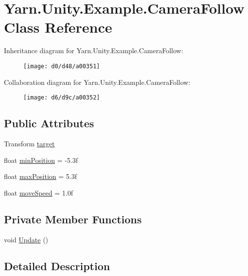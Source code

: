 \hypertarget{a00023}{\section{Yarn.\-Unity.\-Example.\-Camera\-Follow Class Reference}
\label{a00023}
}


Inheritance diagram for Yarn.\-Unity.\-Example.\-Camera\-Follow\-:
\nopagebreak
\begin{figure}[H]
\begin{center}
\leavevmode
\texttt{[image: d0/d48/a00351]}
\end{center}
\end{figure}


Collaboration diagram for Yarn.\-Unity.\-Example.\-Camera\-Follow\-:
\nopagebreak
\begin{figure}[H]
\begin{center}
\leavevmode
\texttt{[image: d6/d9c/a00352]}
\end{center}
\end{figure}
\subsection*{Public Attributes}
\begin{DoxyCompactItemize}
\item 
Transform \hyperlink{a00023_aa5d6958fb14a14ebb74e21c372fcca8b}{target}
\item 
float \hyperlink{a00023_a08c6f6c0ea423c21af99e4b5467d3c9b}{min\-Position} = -\/5.\-3f
\item 
float \hyperlink{a00023_abb0154dcbc2a7d43795beacd61a56de4}{max\-Position} = 5.\-3f
\item 
float \hyperlink{a00023_a3d4f2efe9c2cee8c7ff797cac03f27ec}{move\-Speed} = 1.\-0f
\end{DoxyCompactItemize}
\subsection*{Private Member Functions}
\begin{DoxyCompactItemize}
\item 
void \hyperlink{a00023_a592ddbf8e493bde0a6536c0234869217}{Update} ()
\end{DoxyCompactItemize}


\subsection{Detailed Description}


